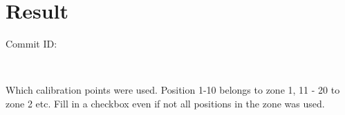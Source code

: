 
\newcommand\w{5}
\section{Result}

\begin{Form}
\noindent Commit ID: \vspace{3mm} 

\TextField[
  name=commitid,
  multiline=true,
  width=10cm,
  height=1cm
]{}

\end{Form}\\

\bigskip

\noindent Which calibration points were used. Position 1-10 belongs to zone 1, 11 - 20 to zone 2 etc. Fill in a checkbox even if not all positions in the zone was used.
\bigskip

\quad
{}\quad
{}\quad
{}

\bigskip






